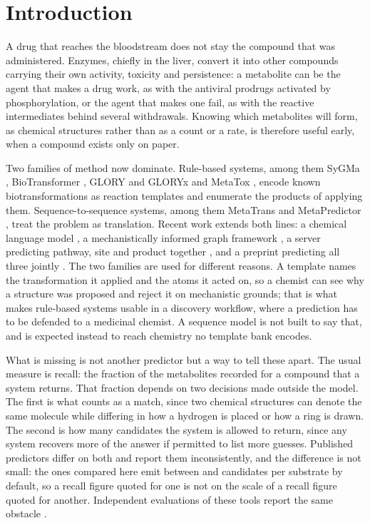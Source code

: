 \section{Introduction}

A drug that reaches the bloodstream does not stay the compound that was administered. Enzymes,
chiefly in the liver, convert it into other compounds carrying their own activity, toxicity and
persistence: a metabolite can be the agent that makes a drug work, as with the antiviral prodrugs
activated by phosphorylation, or the agent that makes one fail, as with the reactive intermediates
behind several withdrawals. Knowing which metabolites will form, as chemical structures rather than as a count or a rate, is
therefore useful early, when a compound exists only on paper.

Two families of method now dominate. Rule-based systems, among them SyGMa \citep{Ridder_2008},
BioTransformer \citep{Djoumbou_Feunang_2019}, GLORY and GLORYx \citep{de_Bruyn_Kops_2019,
de_Bruyn_Kops_2020} and MetaTox \citep{Rudik_2017}, encode known biotransformations as reaction
templates and enumerate the products of applying them. Sequence-to-sequence systems, among them
MetaTrans \citep{Litsa_2020} and MetaPredictor \citep{Zhu_2024}, treat the problem as translation.
Recent work extends both lines: a chemical language model \citep{Larsson_2025}, a mechanistically
informed graph framework \citep{Zhou_2025}, a server predicting pathway, site and product together
\citep{Zhou_2026}, and a preprint predicting all three jointly \citep{Chavan_2026}. The two
families are used for different reasons. A template names the transformation it applied and the
atoms it acted on, so a chemist can see why a structure was proposed and reject it on mechanistic
grounds; that is what makes rule-based systems usable in a discovery workflow, where a prediction
has to be defended to a medicinal chemist. A sequence model is not built to
say that, and is expected instead to reach chemistry no template bank encodes.

What is missing is not another predictor but a way to tell these apart. The usual measure is
recall: the fraction of the metabolites recorded for a compound that a system returns. That
fraction depends on two decisions made outside the model. The first is what counts as a match,
since two chemical structures can denote the same molecule while differing in how a hydrogen is
placed or how a ring is drawn. The second is how many candidates the system is allowed to return,
since any system recovers more of the answer if permitted to list more guesses. Published
predictors differ on both and report them inconsistently, and the difference is not small: the ones
compared here emit between \numEmittedBiotransformer{} and \numEmittedSygma{} candidates
per substrate by default, so a recall figure quoted for one is not on the scale of a recall
figure quoted for another. Independent evaluations of these tools report the same obstacle
\citep{Boyce_2022, Scholz_2023, Gao_2026}.

